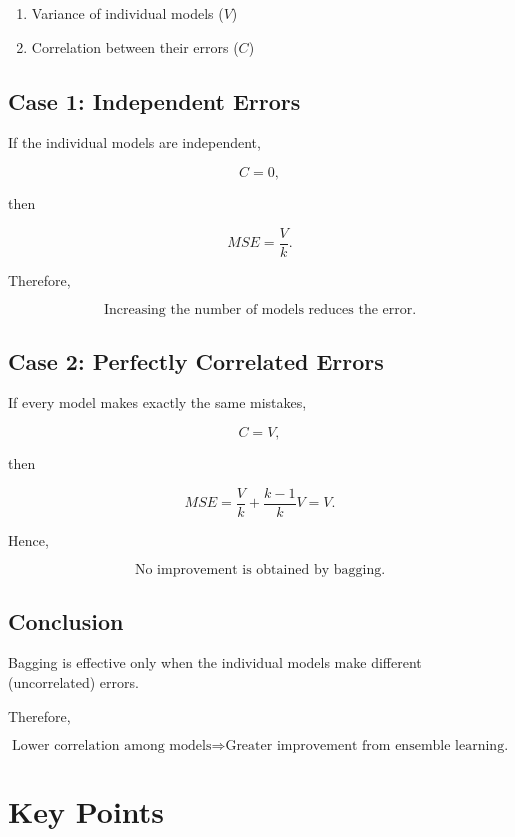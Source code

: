\documentclass[11pt]{article}
\begin{document}
\begin{enumerate}
	\item Variance of individual models ($V$)
	\item Correlation between their errors ($C$)
\end{enumerate}

\subsection*{Case 1: Independent Errors}

If the individual models are independent,

\[
C=0,
\]

then

\[
\boxed{
	MSE=\frac{V}{k}.
}
\]

Therefore,

\[
\boxed{
	\text{Increasing the number of models reduces the error.}
}
\]

\subsection*{Case 2: Perfectly Correlated Errors}

If every model makes exactly the same mistakes,

\[
C=V,
\]

then

\[
MSE
=
\frac{V}{k}
+
\frac{k-1}{k}V
=
V.
\]

Hence,

\[
\boxed{
	\text{No improvement is obtained by bagging.}
}
\]

\subsection*{Conclusion}

Bagging is effective only when the individual models make
different (uncorrelated) errors.

Therefore,

\[
\boxed{
	\text{Lower correlation among models}
	\Longrightarrow
	\text{Greater improvement from ensemble learning.}
}
\]

\section*{Key Points}
\end{document}
